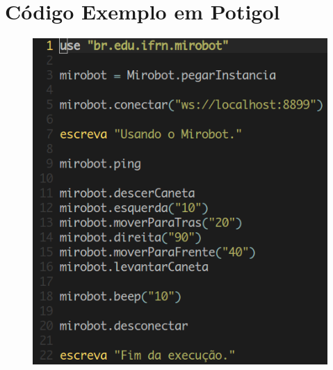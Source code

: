 \apendice
\chapter{Código Exemplo em Potigol}

\begin{figure}[H]
\centering
\includegraphics[scale=0.60]{imagens/teste-potigol.png} 
\end{figure}

